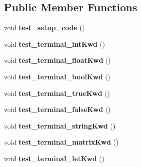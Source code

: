 \subsection*{Public Member Functions}
\begin{DoxyCompactItemize}
\item 
\hypertarget{class_scanner_test_suite_ade832b9b4b3bd92980d43c4050cebd2c}{}void {\bfseries test\+\_\+setup\+\_\+code} ()\label{class_scanner_test_suite_ade832b9b4b3bd92980d43c4050cebd2c}

\item 
\hypertarget{class_scanner_test_suite_af42f8338bfe7b397ea39f565157f64cc}{}void {\bfseries test\+\_\+terminal\+\_\+int\+Kwd} ()\label{class_scanner_test_suite_af42f8338bfe7b397ea39f565157f64cc}

\item 
\hypertarget{class_scanner_test_suite_a5c55d99dbc84996abd740fbabb36314b}{}void {\bfseries test\+\_\+terminal\+\_\+float\+Kwd} ()\label{class_scanner_test_suite_a5c55d99dbc84996abd740fbabb36314b}

\item 
\hypertarget{class_scanner_test_suite_a919ec02392d67e0932affc229b1e72c8}{}void {\bfseries test\+\_\+terminal\+\_\+bool\+Kwd} ()\label{class_scanner_test_suite_a919ec02392d67e0932affc229b1e72c8}

\item 
\hypertarget{class_scanner_test_suite_a88607da81181c529df9b9edf246dfff6}{}void {\bfseries test\+\_\+terminal\+\_\+true\+Kwd} ()\label{class_scanner_test_suite_a88607da81181c529df9b9edf246dfff6}

\item 
\hypertarget{class_scanner_test_suite_a6a4395c74f53b0ff0024d6a81999d1b4}{}void {\bfseries test\+\_\+terminal\+\_\+false\+Kwd} ()\label{class_scanner_test_suite_a6a4395c74f53b0ff0024d6a81999d1b4}

\item 
\hypertarget{class_scanner_test_suite_a141d32b206981d44cbdbf478a20be967}{}void {\bfseries test\+\_\+terminal\+\_\+string\+Kwd} ()\label{class_scanner_test_suite_a141d32b206981d44cbdbf478a20be967}

\item 
\hypertarget{class_scanner_test_suite_ae2d7798c81ef50444efe99f5c7a89148}{}void {\bfseries test\+\_\+terminal\+\_\+matrix\+Kwd} ()\label{class_scanner_test_suite_ae2d7798c81ef50444efe99f5c7a89148}

\item 
\hypertarget{class_scanner_test_suite_aa35e7a92f4fdb1b6014ef0ca9df60ecc}{}void {\bfseries test\+\_\+terminal\+\_\+let\+Kwd} ()\label{class_scanner_test_suite_aa35e7a92f4fdb1b6014ef0ca9df60ecc}


\end{DoxyCompactItemize}
